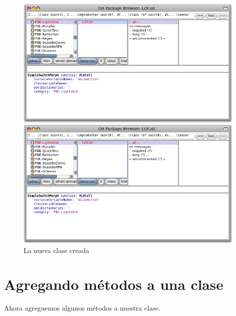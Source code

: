 \documentclass[a4paper,10pt,twoside]{book}
\begin{document}
\begin{figure}[h!t]
\ifluluelse
	{\centerline {\includegraphics[width=\textwidth]{LOCell}}}
	{\centerline {\includegraphics[scale=0.7]{LOCell}}}
\caption{La nueva clase creada }
\end{figure}


\section{Agregando métodos a una clase}

Ahora agreguemos algunos métodos a nuestra clase.

\end{document}
